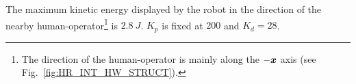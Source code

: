 
The maximum kinetic energy displayed by the robot in the direction of the nearby  human-operator\footnote{The direction of the human-operator is mainly along the $-\mbox{\boldmath${x}$}$ axis (see Fig.~\ref{fig:HR_INT_HW_STRUCT}).} is $2.8~J$. $K_p$ is fixed at $200$ and $K_d = 28$.
